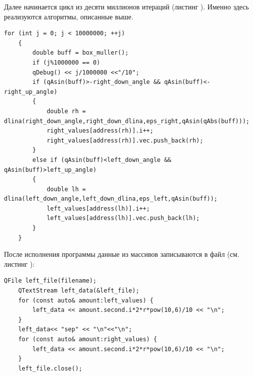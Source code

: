 \documentclass[../AISTR.tex]{subfiles}
\begin{document}
Далее начинается цикл из десяти миллионов итераций (листинг ). Именно здесь реализуются алгоритмы, описанные выше.

\begin{lstlisting}[caption=Тело программы,captionpos=b, label={list:main}]
	for (int j = 0; j < 10000000; ++j)
	{
		double buff = box_muller();
		if (j%1000000 == 0)
		qDebug() << j/1000000 <<"/10";
		if (qAsin(buff)>-right_down_angle && qAsin(buff)<-right_up_angle)
		{
			double rh = dlina(right_down_angle,right_down_dlina,eps_right,qAsin(qAbs(buff)));
			right_values[address(rh)].i++;
			right_values[address(rh)].vec.push_back(rh);
		}
		else if (qAsin(buff)<left_down_angle && qAsin(buff)>left_up_angle)
		{
			double lh = dlina(left_down_angle,left_down_dlina,eps_left,qAsin(buff));
			left_values[address(lh)].i++;
			left_values[address(lh)].vec.push_back(lh);
		}
	}
\end{lstlisting}

После исполнения программы данные из массивов записываются в файл (см. листинг ):
\begin{lstlisting}[caption=Запись данных в файл,captionpos=b, label={list:file}]
	QFile left_file(filename);
	QTextStream left_data(&left_file);
	for (const auto& amount:left_values) {
		left_data << amount.second.i*2*r*pow(10,6)/10 << "\n";
	}
	left_data<< "sep" << "\n"<<"\n";
	for (const auto& amount:right_values) {
		left_data << amount.second.i*2*r*pow(10,6)/10 << "\n";
	}
	left_file.close();
\end{lstlisting}
\end{document}
